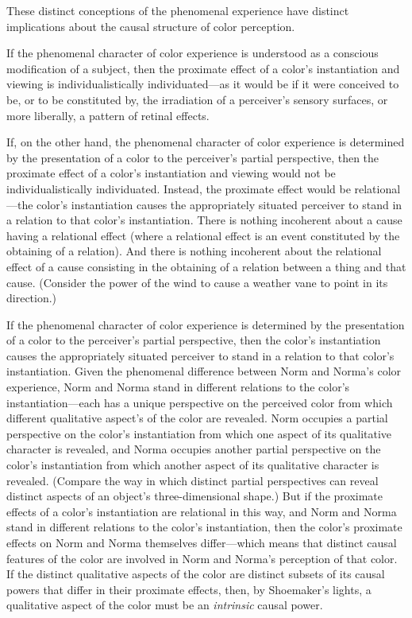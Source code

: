 \documentclass[12pt]{article}
\begin{document}
These distinct conceptions of the phenomenal experience have distinct implications about the causal structure of color perception. 

If the phenomenal character of color experience is understood as a conscious modification of a subject, then the proximate effect of a color's instantiation and viewing is individualistically individuated---as it would be if it were conceived to be, or to be constituted by, the irradiation of a perceiver's sensory surfaces, or more liberally, a pattern of retinal effects. 

If, on the other hand, the phenomenal character of color experience is determined by the presentation of a color to the perceiver's partial perspective, then the proximate effect of a color's instantiation and viewing would not be individualistically individuated. Instead, the proximate effect would be relational---the color's instantiation causes the appropriately situated perceiver to stand in a relation to that color's instantiation. There is nothing incoherent about a cause having a relational effect (where a relational effect is an event constituted by the obtaining of a relation). And there is nothing incoherent about the relational effect of a cause consisting in the obtaining of a relation between a thing and that cause. (Consider the power of the wind to cause a weather vane to point in its direction.)

If the phenomenal character of color experience is determined by the presentation of a color to the perceiver's partial perspective, then the color's instantiation causes the appropriately situated perceiver to stand in a relation to that color's instantiation. Given the phenomenal difference between Norm and Norma's color experience, Norm and Norma stand in different relations to the color's instantiation---each has a unique perspective on the perceived color from which different qualitative aspect's of the color are revealed. Norm occupies a partial perspective on the color's instantiation from which one aspect of its qualitative character is revealed, and Norma occupies another partial perspective on the color's instantiation from which another aspect of its qualitative character is revealed. (Compare the way in which distinct partial perspectives can reveal distinct aspects of an object's three-dimensional shape.) But if the proximate effects of a color's instantiation are relational in this way, and Norm and Norma stand in different relations to the color's instantiation, then the color's proximate effects on Norm and Norma themselves differ---which means that distinct causal features of the color are involved in Norm and Norma's perception of that color. If the distinct qualitative aspects of the color are distinct subsets of its causal powers that differ in their proximate effects, then, by Shoemaker's lights, a qualitative aspect of the color must be an \emph{intrinsic} causal power.
\end{document}
